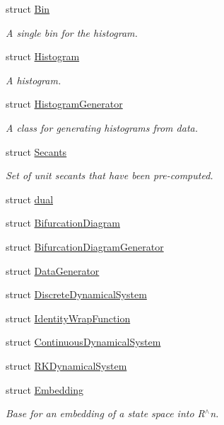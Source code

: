 \begin{DoxyCompactItemize}
struct \hyperlink{struct_d_r_d_s_p_1_1_bin}{Bin}
\begin{DoxyCompactList}\small\item\em A single bin for the histogram. \end{DoxyCompactList}\item 
struct \hyperlink{struct_d_r_d_s_p_1_1_histogram}{Histogram}
\begin{DoxyCompactList}\small\item\em A histogram. \end{DoxyCompactList}\item 
struct \hyperlink{struct_d_r_d_s_p_1_1_histogram_generator}{Histogram\-Generator}
\begin{DoxyCompactList}\small\item\em A class for generating histograms from data. \end{DoxyCompactList}\item 
struct \hyperlink{struct_d_r_d_s_p_1_1_secants}{Secants}
\begin{DoxyCompactList}\small\item\em Set of unit secants that have been pre-\/computed. \end{DoxyCompactList}\item 
struct \hyperlink{struct_d_r_d_s_p_1_1dual}{dual}
\item 
struct \hyperlink{struct_d_r_d_s_p_1_1_bifurcation_diagram}{Bifurcation\-Diagram}
\item 
struct \hyperlink{struct_d_r_d_s_p_1_1_bifurcation_diagram_generator}{Bifurcation\-Diagram\-Generator}
\item 
struct \hyperlink{struct_d_r_d_s_p_1_1_data_generator}{Data\-Generator}
\item 
struct \hyperlink{struct_d_r_d_s_p_1_1_discrete_dynamical_system}{Discrete\-Dynamical\-System}
\item 
struct \hyperlink{struct_d_r_d_s_p_1_1_identity_wrap_function}{Identity\-Wrap\-Function}
\item 
struct \hyperlink{struct_d_r_d_s_p_1_1_continuous_dynamical_system}{Continuous\-Dynamical\-System}
\item 
struct \hyperlink{struct_d_r_d_s_p_1_1_r_k_dynamical_system}{R\-K\-Dynamical\-System}
\item 
struct \hyperlink{struct_d_r_d_s_p_1_1_embedding}{Embedding}
\begin{DoxyCompactList}\small\item\em Base for an embedding of a state space into R$^\wedge$n. \end{DoxyCompactList}\item 

\end{DoxyCompactItemize}
